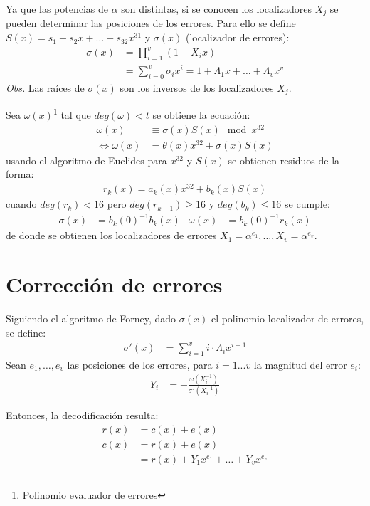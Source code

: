 \documentclass[12pt]{article}
\begin{document}
Ya que las potencias de $\alpha$ son distintas, si se conocen los localizadores $X_j$ se pueden determinar las posiciones de los errores. Para ello se define $S(x) = s_1 + s_2 x + \ldots + s_{32} x^{31}$ y $\sigma (x)$ (localizador de errores):
\begin{align*} 
\sigma (x) &= \prod_{i=1}^v (1 - X_ix) 
\\ &=\sum_{i = 0}^v \sigma_i x^i = 1 + \Lambda_1 x + \ldots + \Lambda_v x^v
\end{align*}
\textit{Obs. } Las raíces de $\sigma (x)$ son los inversos de los localizadores $X_j$. 

Sea $\omega(x)$\footnote{Polinomio evaluador de errores} tal que $deg(\omega ) < t$ se obtiene la ecuación:
\begin{align*}
\omega (x) &\equiv \sigma (x) S(x)\mod x^{32}
\\\Leftrightarrow \omega (x) &= \theta (x) x^{32} + \sigma (x) S(x)
\end{align*}
usando el algoritmo de Euclides para $x^{32}$ y $S(x)$ se obtienen residuos de la forma:
\begin{align*}
r_k(x) = a_k(x) x^{32} + b_k(x) S(x)
\end{align*}
cuando $deg(r_k) < 16$ pero $deg(r_{k-1}) \geq 16$ y $deg(b_k) \leq 16$ se cumple:
\begin{align*}
\sigma (x) &= b_k(0)^{-1}b_k(x) & \omega (x) &= b_k(0)^{-1}r_k(x)
\end{align*}
de donde se obtienen los localizadores de errores $X_1 = \alpha^{e_1}, \ldots , X_v  = \alpha^{e_v}$.
\section{Corrección de errores}
Siguiendo el algoritmo de Forney, dado $\sigma (x)$ el polinomio localizador de errores, se define:
\begin{align*}
\sigma '(x) &= \sum_{i=1}^v i \cdot \Lambda_i x^{i-1}
\end{align*}
Sean $e_1, \ldots , e_v$ las posiciones de los errores, para $i=1...v$ la magnitud del error $e_i$:
\begin{align*}
Y_i &= -\frac{\omega (X_i^{-1})}{\sigma '(X_i^{-1})}
\end{align*}

Entonces, la decodificación resulta:
\begin{align*}
r(x) &= c(x) + e(x)
\\c(x) &= r(x) + e(x)
\\ &= r(x) + Y_1x^{e_1} + \ldots + Y_vx^{e_v}
\end{align*}
\end{document}
